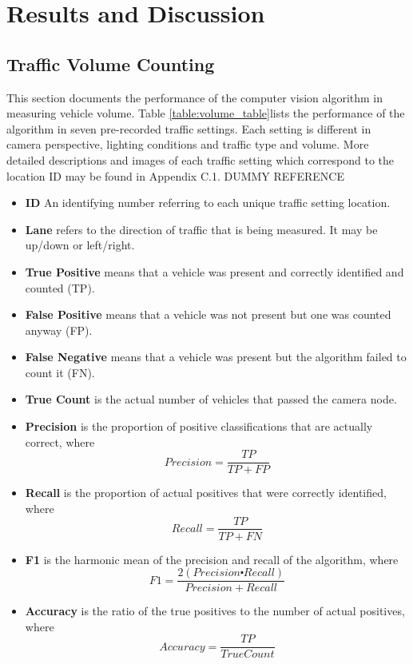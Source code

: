\chapter{Results and Discussion}

\section{Traffic Volume Counting}

This section documents the performance of the computer vision algorithm in measuring vehicle volume. Table \ref{table:volume_table}lists the performance of the algorithm in seven pre-recorded traffic settings. Each setting is different in camera perspective, lighting conditions and traffic type and volume. More detailed descriptions and images of each traffic setting which correspond to the location ID may be found in Appendix C.1. \cite{udacity_cv} DUMMY REFERENCE

\begin{itemize}
\item\textbf{ID} An identifying number referring to each unique traffic setting location.
\item\textbf{Lane} refers to the direction of traffic that is being measured. It may be up/down or left/right.
\item\textbf{True Positive} means that a vehicle was present and correctly identified and counted (TP).
\item\textbf{False Positive} means that a vehicle was not present but one was counted anyway (FP).
\item\textbf{False Negative} means that a vehicle was present but the algorithm failed to count it (FN).
\item\textbf{True Count} is the actual number of vehicles that passed the camera node. 
\item\textbf{Precision} is the proportion of positive classifications that are actually correct, where \[Precision = \frac{TP}{TP + FP}\]
\item\textbf{Recall} is the proportion of actual positives that were correctly identified, where \[Recall = \frac{TP}{TP + FN}\]
\item\textbf{F1} is the harmonic mean of the precision and recall of the algorithm, where \[F1 = \frac{2(Precision \centerdot Recall)}{Precision + Recall}\]
\item\textbf{Accuracy} is the ratio of the true positives to the number of actual positives, where \[Accuracy = \frac{TP}{True Count}\]
\end{itemize}



